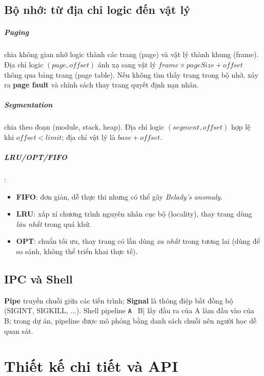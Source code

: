 \documentclass[12pt,a4paper]{report}
\begin{document}
\section{Bộ nhớ: từ địa chỉ logic đến vật lý}
\paragraph{Paging} chia không gian nhớ logic thành các trang (page) và vật lý thành khung (frame). Địa chỉ logic \((page, offset)\) ánh xạ sang vật lý \(frame\times pageSize + offset\) thông qua bảng trang (page table). Nếu không tìm thấy trang trong bộ nhớ, xảy ra \textbf{page fault} và chính sách thay trang quyết định nạn nhân.

\paragraph{Segmentation} chia theo đoạn (module, stack, heap). Địa chỉ logic \((segment, offset)\) hợp lệ khi \(offset < limit\); địa chỉ vật lý là \(base + offset\).

\paragraph{LRU/OPT/FIFO}:
\begin{itemize}
  \item \textbf{FIFO}: đơn giản, dễ thực thi nhưng có thể gây \textit{Belady's anomaly}.
  \item \textbf{LRU}: xấp xỉ chương trình nguyên nhân cục bộ (locality), thay trang dùng \textit{lâu nhất} trong quá khứ.
  \item \textbf{OPT}: chuẩn tối ưu, thay trang có lần dùng \textit{xa nhất} trong tương lai (dùng để so sánh, không thể triển khai thực tế).
\end{itemize}

\section{IPC và Shell}
\textbf{Pipe} truyền chuỗi giữa các tiến trình; \textbf{Signal} là thông điệp bất đồng bộ (SIGINT, SIGKILL, ...). Shell pipeline \verb|A | B| lấy đầu ra của A làm đầu vào của B; trong dự án, pipeline được mô phỏng bằng danh sách chuỗi nên người học dễ quan sát.

\chapter{Thiết kế chi tiết và API}
\end{document}
